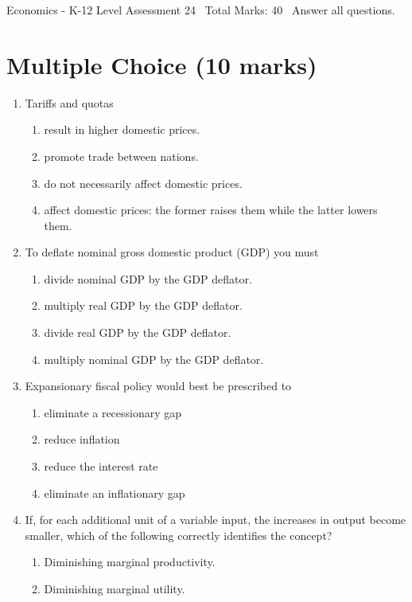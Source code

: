 \documentclass[12pt]{article}
\begin{document}
\begin{center}
Economics - K-12 Level Assessment 24 \
Total Marks: 40 \
Answer all questions.
\end{center}

\section*{Multiple Choice (10 marks)}
\begin{enumerate}[label=\arabic*.]
\item Tariffs and quotas
\begin{enumerate}[label=(\alph*)]
    \item result in higher domestic prices.
    \item promote trade between nations.
    \item do not necessarily affect domestic prices.
    \item affect domestic prices: the former raises them while the latter lowers them.
\end{enumerate}
\item To deflate nominal gross domestic product (GDP) you must
\begin{enumerate}[label=(\alph*)]
    \item divide nominal GDP by the GDP deflator.
    \item multiply real GDP by the GDP deflator.
    \item divide real GDP by the GDP deflator.
    \item multiply nominal GDP by the GDP deflator.
\end{enumerate}
\item Expansionary fiscal policy would best be prescribed to
\begin{enumerate}[label=(\alph*)]
    \item eliminate a recessionary gap
    \item reduce inflation
    \item reduce the interest rate
    \item eliminate an inflationary gap
\end{enumerate}
\item If, for each additional unit of a variable input, the increases in output become smaller, which of the following correctly identifies the concept?
\begin{enumerate}[label=(\alph*)]
    \item Diminishing marginal productivity.
    \item Diminishing marginal utility.

\end{enumerate}
\end{enumerate}
\end{document}
